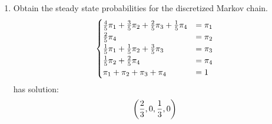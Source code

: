 \documentclass[12pt]{article}
\begin{document}
\begin{enumerate}
\begin{enumerate}
	\item Obtain the steady state probabilities for the discretized Markov chain.
$$
\begin{cases}
{4\over5}\pi_1+{3\over5}\pi_2+{2\over5}\pi_3+{1\over5}\pi_4&=\pi_1\\
{2\over5}\pi_4&=\pi_2\\
{1\over5}\pi_1+{1\over5}\pi_2+{3\over5}\pi_3&=\pi_3\\
{1\over5}\pi_2+{2\over5}\pi_4&=\pi_4\\
\pi_1+\pi_2+\pi_3+\pi_4&=1
\end{cases}
$$
has solution:
$$\left({2\over3},0,{1\over3},0\right)$$
\end{enumerate}

\end{enumerate}
\end{document}
